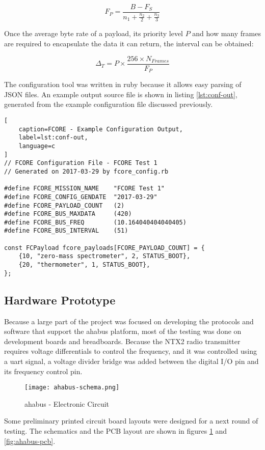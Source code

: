\[F_P = \frac{B-F_S}{n_{1} + \frac{n_2}{2} + \frac{n_3}{3}} \]

Once the average byte rate of a payload, its priority level $P$ and how many
frames are required to encapsulate the data it can return, the interval can be
obtained:

\[ \Delta_T = P \times \frac{256 \times N_{Frames}}{F_P} \]

The configuration tool was written in ruby because it allows easy parsing of
JSON files. An example output source file is shown in listing 
\ref{lst:conf-out}, generated from the example configuration file discussed
previously.

\begin{lstlisting}[
    caption=FCORE - Example Configuration Output,
    label=lst:conf-out,
    language=c
]
// FCORE Configuration File - FCORE Test 1
// Generated on 2017-03-29 by fcore_config.rb

#define FCORE_MISSION_NAME    "FCORE Test 1"
#define FCORE_CONFIG_GENDATE  "2017-03-29"
#define FCORE_PAYLOAD_COUNT   (2)
#define FCORE_BUS_MAXDATA     (420)
#define FCORE_BUS_FREQ        (10.164040404040405)
#define FCORE_BUS_INTERVAL    (51)

const FCPayload fcore_payloads[FCORE_PAYLOAD_COUNT] = {
    {10, "zero-mass spectrometer", 2, STATUS_BOOT},
    {20, "thermometer", 1, STATUS_BOOT},
};
\end{lstlisting}

\subsection{Hardware Prototype}
\label{sec:flight-hardware}

Because a large part of the project was focused on developing the protocols and
software that support the \acrshort{ahabus} platform, most of the testing was
done on development boards and breadboards. Because the NTX2 radio transmitter
requires voltage differentials to control the frequency, and it was controlled
using a \acrshort{uart} signal, a voltage divider bridge was added between the
digital I/O pin and its frequency control pin.

\begin{figure}[H]
\texttt{[image: ahabus-schema.png]}
\centering
\caption{\acrshort{ahabus} - Electronic Circuit}
\label{fig:ahabus-schema}
\end{figure}

Some preliminary printed circuit board layouts were designed for a next round
of testing. The schematics and the PCB layout are shown in figures
\ref{fig:ahabus-schema} and \ref{fig:ahabus-pcb}.

